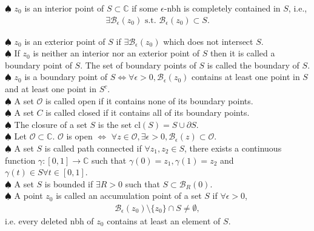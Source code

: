 \documentclass{article}
\theoremstyle{definition}
\newcommand{\p}{\partial}
\newcommand{\C}{\mathbb{C}}
\newcommand{\B}{\mathcal{B}}
\begin{document}
\noindent$\spadesuit$ $z_0$ is an interior point of $S \subset \C$ if some $\epsilon$-nbh is completely contained in $S$, i.e.,
\begin{align}
\exists \B_\epsilon(z_0) \text{ s.t. } \B_\epsilon(z_0) \subset S.
\end{align}


\noindent $\spadesuit$ $z_0$ is an exterior point of $S$ if $\exists \B_\epsilon(z_0)$ which does not intersect $S$.\\

\noindent $\spadesuit$ If $z_0$ is neither an interior nor an exterior point of $S$ then it is called a boundary point of $S$. The set of boundary points of $S$ is called the boundary of $S$.\\

\noindent $\spadesuit$ $z_0$ is a boundary point of $S \iff \forall \epsilon> 0, \B_\epsilon(z_0)$ contains at least one point in $S$ and at least one point in $S^c$.\\

\noindent $\spadesuit$ A set $\mathcal{O}$ is called open if it contains none of its boundary points. \\

\noindent $\spadesuit$ A set $C$ is called closed if it contains all of its boundary points. \\

\noindent $\spadesuit$ The closure of a set $S$ is the set $\text{cl}(S) = S \cup \p S$.\\

\noindent $\spadesuit$ Let $\mathcal{O} \subset \C$. $\mathcal{O}$ is open $\iff$ $\forall z \in \mathcal{O}, \exists \epsilon > 0, \B_\epsilon(z) \subset \mathcal{O}$.  \\

\noindent $\spadesuit$ A set $S$ is called path connected if $\forall z_1,z_2 \in S$, there exists a continuous function $\gamma: [0,1] \to \C$ such that $\gamma(0) = z_1, \gamma(1) = z_2$ and $\gamma(t) \in S \forall t \in [0,1]$.\\

\noindent $\spadesuit$ A set $S$ is bounded if $\exists R > 0$ such that $S \subset \B_R(0)$.\\

\noindent $\spadesuit$ A point $z_0$ is called an accumulation point of a set $S$ if $\forall \epsilon > 0$,
\begin{align}
\B_\epsilon(z_0)\setminus\{z_0\} \cap S \neq \emptyset,
\end{align} 
i.e. every deleted nbh of $z_0$ contains at least an element of $S$. \\
\end{document}
